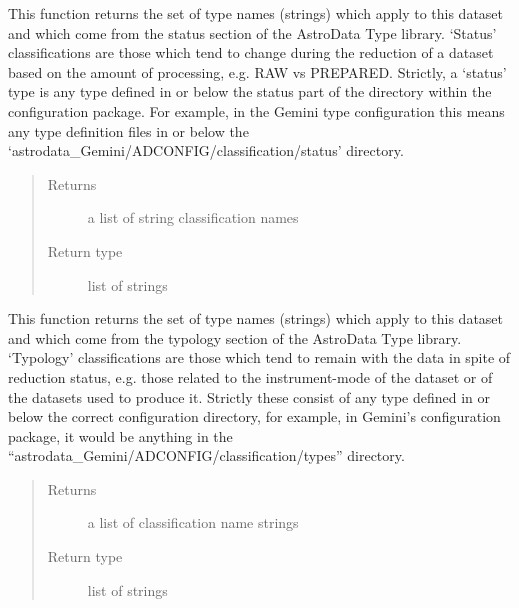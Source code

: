 \documentclass[letterpaper,10pt,english]{sphinxmanual}
\begin{document}

\begin{fulllineitems}
\label{chapter_AstroDataClass:astrodata.data.AstroData.get_status}
This function returns the set of type names (strings) which apply to
this dataset and which come from the status section of the AstroData
Type library. `Status' classifications are those which tend to change
during the reduction of a dataset based on the amount of processing,
e.g. RAW vs PREPARED.  Strictly, a `status' type 
is any type defined in or below the status part of the 
 directory within the 
configuration package. For example, in the Gemini type configuration 
this means any type 
definition files in or below the 
`astrodata\_Gemini/ADCONFIG/classification/status' directory.
\begin{quote}\begin{description}
\item[{Returns}] \leavevmode
a list of string classification names

\item[{Return type}] \leavevmode
list of strings

\end{description}\end{quote}

\end{fulllineitems}



\begin{fulllineitems}
\label{chapter_AstroDataClass:astrodata.data.AstroData.get_typology}
This function returns the set of type names (strings) which apply to
this dataset and which come from the typology section of the AstroData
Type library. `Typology' classifications are those which tend to remain
with the data in spite of reduction status, e.g. those related to the
instrument-mode of the dataset or of the datasets used to produce
it. Strictly these consist of any type defined in or below
the correct configuration directory, for example, in Gemini's configuration
package, it would be anything in the
``astrodata\_Gemini/ADCONFIG/classification/types''  directory.
\begin{quote}\begin{description}
\item[{Returns}] \leavevmode
a list of classification name strings

\item[{Return type}] \leavevmode
list of strings

\end{description}\end{quote}

\end{fulllineitems}
\end{document}
